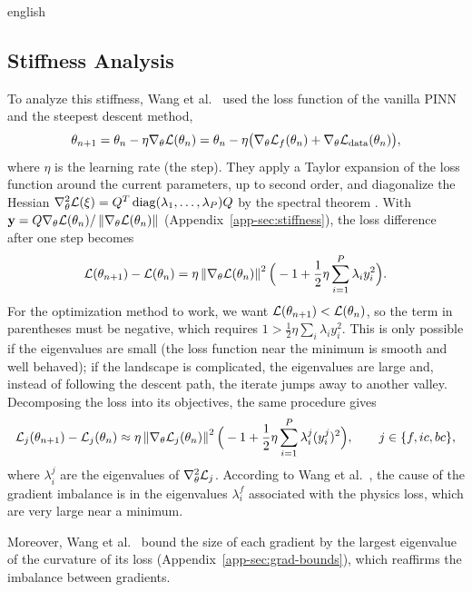 \documentclass[0000.tex]{subfiles}
\begin{document}
\begin{hyphenrules}{english}
\subsection{Stiffness Analysis}

To analyze this stiffness, Wang et al.~\cite{wang2021gradient} used the loss function of the vanilla PINN and
the steepest descent method,
\begin{equation}
  \theta_{n+1}=\theta_n-\eta\nabla_\theta\mathcal{L}(\theta_n)=\theta_n-\eta\big(\nabla_\theta\mathcal{L}_f(\theta_n)+\nabla_\theta\mathcal{L}_{\mathrm{data}}(\theta_n)\big),
  \label{eq:gd}
\end{equation}
where $\eta$ is the learning rate (the step). They apply a Taylor expansion of the loss function around the current parameters, up to second order,
and diagonalize the Hessian $\nabla^2_\theta\mathcal{L}(\xi)=Q^{T}\operatorname{diag}(\lambda_1,\dots,\lambda_P)Q$ by the
spectral theorem \cite{trefethen1997}. With $\mathbf{y}=Q\nabla_\theta\mathcal{L}(\theta_n)/\left\lVert \nabla_\theta\mathcal{L}(\theta_n) \right\rVert$
(Appendix~\ref{app-sec:stiffness}), the loss difference after one step becomes
\begin{equation}
  \mathcal{L}(\theta_{n+1})-\mathcal{L}(\theta_n)=\eta\left\lVert \nabla_\theta\mathcal{L}(\theta_n) \right\rVert^2
  \Big(-1+\frac12\eta\sum_{i=1}^{P}\lambda_iy_i^2\Big).
  \label{eq:stiffness}
\end{equation}
For the optimization method to work, we want $\mathcal{L}(\theta_{n+1})<\mathcal{L}(\theta_n)$, so the term in
parentheses must be negative, which requires $1>\frac12\eta\sum_i\lambda_iy_i^2$. This is only possible if
the eigenvalues are small (the loss function near the minimum is smooth and well behaved); if the
landscape is complicated, the eigenvalues are large and, instead of following the descent path, the
iterate jumps away to another valley. Decomposing the loss into its objectives, the same procedure gives
\begin{equation}
  \mathcal{L}_j(\theta_{n+1})-\mathcal{L}_j(\theta_n)\approx\eta\left\lVert \nabla_\theta\mathcal{L}_j(\theta_n) \right\rVert^2
  \Big(-1+\frac12\eta\sum_{i=1}^{P}\lambda^{j}_i(y^{j}_i)^2\Big),\qquad j\in\{f,ic,bc\},
  \label{eq:stiffness-split}
\end{equation}
where $\lambda^{j}_i$ are the eigenvalues of $\nabla^2_\theta\mathcal{L}_j$. According to
Wang et al.~\cite{wang2021gradient}, the cause of the gradient imbalance is in the eigenvalues $\lambda^{f}_i$
associated with the physics loss, which are very large near a minimum.

Moreover, Wang et al.~\cite{wang2021gradient} bound the size of each gradient by the largest eigenvalue of
the curvature of its loss (Appendix~\ref{app-sec:grad-bounds}), which reaffirms the imbalance between
gradients.


\end{hyphenrules}
\end{document}
